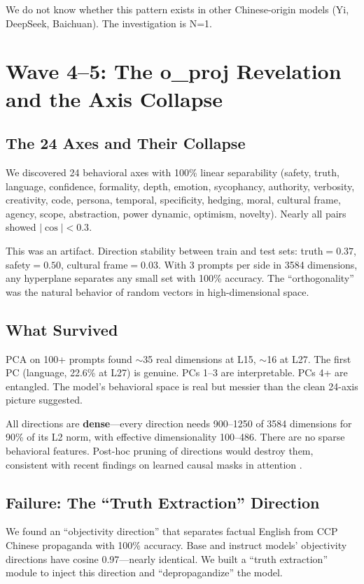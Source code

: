 \documentclass[11pt,a4paper]{article}
\begin{document}
We do not know whether this pattern exists in other Chinese-origin models (Yi, DeepSeek, Baichuan). The investigation is N=1.

\section{Wave 4--5: The o\_proj Revelation and the Axis Collapse}

\subsection{The 24 Axes and Their Collapse}
We discovered 24 behavioral axes with 100\% linear separability (safety, truth, language, confidence, formality, depth, emotion, sycophancy, authority, verbosity, creativity, code, persona, temporal, specificity, hedging, moral, cultural frame, agency, scope, abstraction, power dynamic, optimism, novelty). Nearly all pairs showed $|\cos| < 0.3$.

This was an artifact. Direction stability between train and test sets: truth$=0.37$, safety$=0.50$, cultural frame$=0.03$. With 3 prompts per side in 3584 dimensions, any hyperplane separates any small set with 100\% accuracy. The ``orthogonality'' was the natural behavior of random vectors in high-dimensional space.

\subsection{What Survived}
PCA on 100+ prompts found $\sim$35 real dimensions at L15, $\sim$16 at L27. The first PC (language, 22.6\% at L27) is genuine. PCs 1--3 are interpretable. PCs 4+ are entangled. The model's behavioral space is real but messier than the clean 24-axis picture suggested.

All directions are \textbf{dense}---every direction needs 900--1250 of 3584 dimensions for 90\% of its L2 norm, with effective dimensionality 100--486. There are no sparse behavioral features. Post-hoc pruning of directions would destroy them, consistent with recent findings on learned causal masks in attention \cite{causal_masks_not_sparse}.

\subsection{Failure: The ``Truth Extraction'' Direction}
We found an ``objectivity direction'' that separates factual English from CCP Chinese propaganda with 100\% accuracy. Base and instruct models' objectivity directions have cosine 0.97---nearly identical. We built a ``truth extraction'' module to inject this direction and ``depropagandize'' the model.
\end{document}
